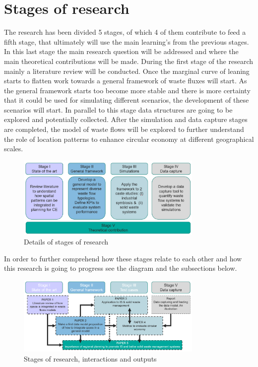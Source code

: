\section{Stages of research}
The research has been divided 5 stages, of which 4 of them contribute to feed a fifth stage, that ultimately will use the main learning's from the previous stages. In this last stage the main research question will be addressed and where the main theoretical contributions will be made. During the first stage of the research mainly a literature review will be conducted. Once the marginal curve of leaning starts to flatten work towards a general framework of waste fluxes will start. As the general framework starts too become more stable and there is more certainty that it could be used for simulating different scenarios, the development of these scenarios will start. In parallel to this stage data structures are going to be explored and potentially collected. After the simulation and data capture stages are completed, the model of waste flows will be explored to further understand the role of location patterns to enhance circular economy at different geographical scales. 

\begin{figure}[h!]
    \centering
    \includegraphics[width=0.8\textwidth]{sections/asset/stage.PNG}
    \caption{Details of stages of research}
    \label{fig:research1s}
\end{figure}

In order to further comprehend how these stages relate to each other and how this research is going to progress see the diagram and the subsections below.

\begin{figure}[h!]
    \centering
    \includegraphics[width=0.8\textwidth]{sections/asset/stage2.PNG}
    \caption{Stages of research, interactions and outputs}
    \label{fig:research2}
\end{figure}






